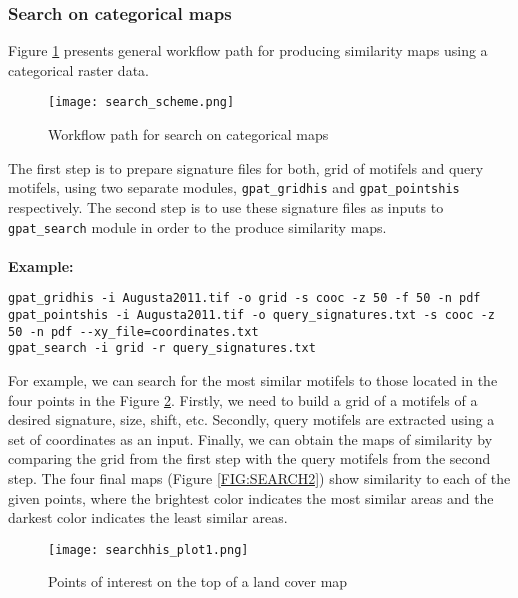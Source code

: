 \subsubsection{Search on categorical maps}
Figure \ref{FIG:SEARCH} presents general workflow path for producing similarity maps using a categorical raster data. 

\begin{figure}[H]
	\centering
	\texttt{[image: search\_scheme.png]}
	\caption{Workflow path for search on categorical maps}
	\label{FIG:SEARCH}
\end{figure}

The first step is to prepare signature files for both, grid of motifels and query motifels, using two separate modules, {\tt gpat\_gridhis} and {\tt gpat\_pointshis} respectively. 
The second step is to use these signature files as inputs to {\tt gpat\_search} module in order to the produce similarity maps.\\\\

{\bf Example:}

\begin{minipage}{\linewidth}
\begin{lstlisting}
gpat_gridhis -i Augusta2011.tif -o grid -s cooc -z 50 -f 50 -n pdf
gpat_pointshis -i Augusta2011.tif -o query_signatures.txt -s cooc -z 50 -n pdf --xy_file=coordinates.txt
gpat_search -i grid -r query_signatures.txt
\end{lstlisting}
\end{minipage}

For example, we can search for the most similar motifels to those located in the four points in the Figure \ref{FIG:SEARCH1}. 
Firstly, we need to build a grid of a motifels of a desired signature, size, shift, etc. 
Secondly, query motifels are extracted using a set of coordinates as an input. 
Finally, we can obtain the maps of similarity by comparing the grid from the first step with the query motifels from the second step.
The four final maps (Figure \ref{FIG:SEARCH2}) show similarity to each of the given points, where the brightest color indicates the most similar areas and the darkest color indicates the least similar areas.

\begin{figure}[H]
	\centering
	\texttt{[image: searchhis\_plot1.png]}
	\caption{Points of interest on the top of a land cover map}
	\label{FIG:SEARCH1}
\end{figure}

